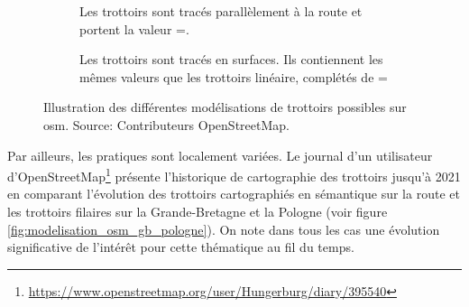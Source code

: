 \begin{figure}[ht]
\begin{subfigure}[t]{.32\linewidth}
        \caption{Les trottoirs sont tracés parallèlement à la route et portent la valeur =.}
    \end{subfigure}
    \hfill
    \begin{subfigure}[t]{.32\linewidth}
        \caption{Les trottoirs sont tracés en surfaces. Ils contiennent les mêmes valeurs que les trottoirs linéaire, complétés de =}
    \end{subfigure}
    \caption[Différentes modélisation de trottoirs sur OpenStreetMap]{Illustration des différentes modélisations de trottoirs possibles sur \gls{osm}. Source: Contributeurs OpenStreetMap.}
    \label{fig:modelisation_trottoir_osm}
\end{figure}

\newpar{}


Par ailleurs, les pratiques sont localement variées. Le journal d'un utilisateur d'OpenStreetMap\footnote{\url{https://www.openstreetmap.org/user/Hungerburg/diary/395540}} présente l'historique de cartographie des trottoirs jusqu'à 2021 en comparant l'évolution des trottoirs cartographiés en sémantique sur la route et les trottoirs filaires sur la Grande-Bretagne et la Pologne (voir figure \ref{fig:modelisation_osm_gb_pologne}). On note dans tous les cas une évolution significative de l'intérêt pour cette thématique au fil du temps.

